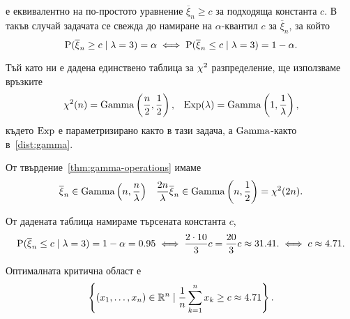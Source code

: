 \documentclass[numbers=endperiod, DIV=15, bibliography=totocnumbered]{scrartcl}
\begin{document}
\begin{solution}
\begin{enumerate}[label=\alph*)]
    е еквивалентно на по-простото уравнение $\overline \xi_n \geq c$ за подходяща константа $c$. В такъв случай задачата се свежда до намиране на $\alpha$-квантил $c$ за $\overline \xi_n$, за който
    \begin{displaymath}
      \operatorname{P}(\overline \xi_n \geq c \mid \lambda = 3) = \alpha
      \iff
      \operatorname{P}(\overline \xi_n \leq c \mid \lambda = 3) = 1 - \alpha.
    \end{displaymath}

    Тъй като ни е дадена единствено таблица за $\operatorname{\chi^2}$ разпределение, ще използваме връзките
    \begin{align*}
      \operatorname{\chi^2}(n) = \operatorname{Gamma} \left(\frac n 2, \frac 1 2 \right),
      &&
      \operatorname{Exp}(\lambda) = \operatorname{Gamma}\left(1, \frac 1 \lambda \right),
    \end{align*}
    където $\operatorname{Exp}$ е параметризирано както в тази задача, а $\operatorname{Gamma}$-както в~\ref{dist:gamma}.

    От твърдение~\ref{thm:gamma-operations} имаме
    \begin{align*}
      \overline \xi_n \in \operatorname{Gamma}\left( n, \frac n \lambda \right)
      &&
      \frac {2n} \lambda \overline \xi_n \in \operatorname{Gamma}\left( n, \frac 1 2 \right) = \operatorname{\chi^2}(2n).
    \end{align*}

    От дадената таблица намираме търсената константа $c$,
    \begin{displaymath}
      \operatorname{P}(\overline \xi_n \leq c \mid \lambda = 3) = 1 - \alpha = 0.95
      \iff
      \frac {2 \cdot 10} 3 c = \frac {20} 3 c \approx 31.41.
      \iff
      c \approx 4.71.
    \end{displaymath}

    Оптималната критична област е
    \begin{displaymath}
      \left \{ (x_1, \ldots, x_n) \in \mathbb{R}^n \mid \frac 1 n \sum_{k=1}^n x_k \geq c \approx 4.71 \right \}.
    \end{displaymath}
  \end{enumerate}
\end{solution}
\end{document}
